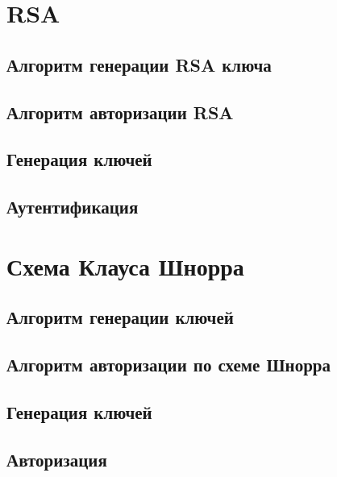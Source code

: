 \documentclass{article}
\begin{document}
\section{RSA}
\subsection{Алгоритм генерации RSA ключа}
\subsection{Алгоритм авторизации RSA}
\subsection{Генерация ключей}
\subsection{Аутентификация}

\section{Схема Клауса Шнорра}
\subsection{Алгоритм генерации ключей}
\subsection{Алгоритм авторизации по схеме Шнорра}
\subsection{Генерация ключей}
\subsection{Авторизация}
\end{document}
